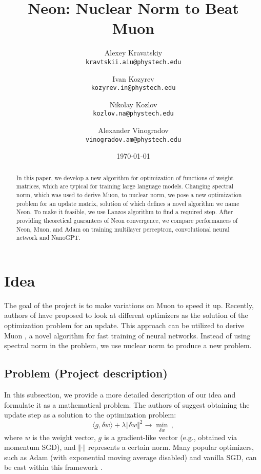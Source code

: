\documentclass[]{scrartcl}
\title{Neon: Nuclear Norm to Beat Muon}
\author{
  Alexey Kravatskiy\\
  \texttt{kravtskii.aiu@phystech.edu}
  \and
  Ivan Kozyrev\\
  \texttt{kozyrev.in@phystech.edu}
  \and
  Nikolay Kozlov \\
  \texttt{kozlov.na@phystech.edu}
  \and
  Alexander Vinogradov \\
  \texttt{vinogradov.am@phystech.edu}
}
\date{\today}
\newcommand{\norm}[1]{\Vert{#1}\Vert}
\begin{document}
\maketitle

\begin{abstract}
In this paper, we develop a new algorithm for optimization of functions of weight matrices, which are typical for training large language models. Changing spectral norm, which was used to derive Muon, to nuclear norm, we pose a new optimization problem for an update matrix, solution of which defines a novel algorithm we name Neon. To make it feasible, we use Lanzos algorithm to find a required step. After providing theoretical guarantees of Neon convergence, we compare performances of Neon, Muon, and Adam on training multilayer perceptron, convolutional neural network and NanoGPT.

\end{abstract}

\section{Idea}
The goal of the project is to make variations on Muon to speed it up. Recently, authors of \cite{bernstein2024oldoptimizernewnorm} have proposed to look at different optimizers as the solution of the optimization problem for an update. This approach can be utilized to derive Muon \cite{jordan2024muon}, a novel algorithm for fast training of neural networks. Instead of using spectral norm in the problem, we use nuclear norm to produce a new problem. %

\subsection{Problem (Project description)}

In this subsection, we provide a more detailed description of our idea and formulate it as a mathematical problem. The authors of \cite{bernstein2024oldoptimizernewnorm} suggest obtaining the update step as a solution to the optimization problem:
\begin{equation}
    \langle g, \delta w \rangle + \lambda \norm{\delta w}^2 \to \min_{\delta w}\,,
\end{equation}
where $w$ is the weight vector, $g$ is a gradient-like vector (e.g., obtained via momentum SGD), and $\norm{\cdot}$ represents a certain norm. Many popular optimizers, such as Adam (with exponential moving average disabled) and vanilla SGD, can be cast within this framework \cite{bernstein2024oldoptimizernewnorm}.
\end{document}
